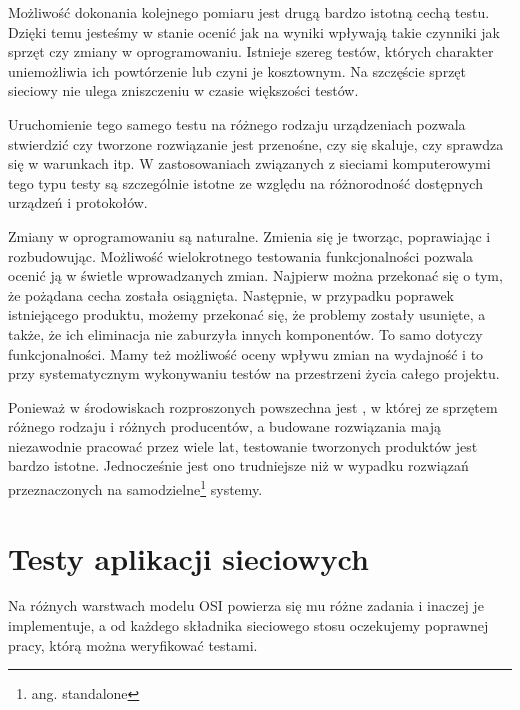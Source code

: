 \documentclass[00-praca-magisterska.tex]{subfiles}
\begin{document}
Możliwość dokonania kolejnego pomiaru jest drugą bardzo istotną cechą testu.
Dzięki temu jesteśmy w stanie ocenić jak na wyniki wpływają takie czynniki jak
sprzęt czy zmiany w oprogramowaniu. Istnieje szereg testów, których charakter
uniemożliwia ich powtórzenie lub czyni je kosztownym. Na szczęście sprzęt
sieciowy nie ulega zniszczeniu w czasie większości testów.

Uruchomienie tego samego testu na różnego rodzaju urządzeniach pozwala
stwierdzić czy tworzone rozwiązanie jest przenośne, czy się skaluje, czy
sprawdza się w  warunkach itp. W zastosowaniach związanych z
sieciami komputerowymi tego typu testy są szczególnie istotne ze względu na
różnorodność dostępnych urządzeń i protokołów.

Zmiany w oprogramowaniu są naturalne. Zmienia się je tworząc, poprawiając i
rozbudowując. Możliwość wielokrotnego testowania funkcjonalności pozwala ocenić
ją w świetle wprowadzanych zmian. Najpierw można przekonać się o tym, że
pożądana cecha została osiągnięta. Następnie, w przypadku poprawek istniejącego
produktu, możemy przekonać się, że problemy zostały usunięte, a także, że ich
eliminacja nie zaburzyła innych komponentów. To samo dotyczy 
funkcjonalności. Mamy też możliwość oceny wpływu zmian na wydajność i to przy
systematycznym wykonywaniu testów na przestrzeni życia całego projektu.

Ponieważ w środowiskach rozproszonych powszechna jest , w
której  ze sprzętem różnego rodzaju i różnych
producentów, a budowane rozwiązania mają niezawodnie pracować przez wiele lat,
testowanie tworzonych produktów jest  bardzo istotne. Jednocześnie
jest ono trudniejsze niż w wypadku rozwiązań przeznaczonych na
samodzielne\footnote{ang. standalone} systemy.


\section{Testy aplikacji sieciowych}

 Na różnych warstwach modelu OSI powierza się
mu różne zadania i inaczej je implementuje, a od każdego składnika sieciowego
stosu oczekujemy poprawnej pracy, którą można weryfikować testami.
\end{document}
